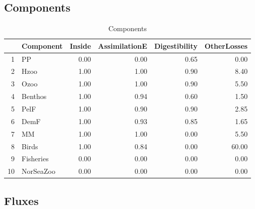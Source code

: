 \documentclass{article}
\begin{document}
\clearpage

\subsection{Components}

\begin{table}[ht]
\centering
\begin{tabular}{rlrrrr}
  \hline
 & Component & Inside & AssimilationE & Digestibility & OtherLosses \\ 
  \hline
1 & PP & 0.00 & 0.00 & 0.65 & 0.00 \\ 
  2 & Hzoo & 1.00 & 1.00 & 0.90 & 8.40 \\ 
  3 & Ozoo & 1.00 & 1.00 & 0.90 & 5.50 \\ 
  4 & Benthos & 1.00 & 0.94 & 0.60 & 1.50 \\ 
  5 & PelF & 1.00 & 0.90 & 0.90 & 2.85 \\ 
  6 & DemF & 1.00 & 0.93 & 0.85 & 1.65 \\ 
  7 & MM & 1.00 & 1.00 & 0.00 & 5.50 \\ 
  8 & Birds & 1.00 & 0.84 & 0.00 & 60.00 \\ 
  9 & Fisheries & 0.00 & 0.00 & 0.00 & 0.00 \\ 
  10 & NorSeaZoo & 0.00 & 0.00 & 0.00 & 0.00 \\ 
   \hline
\end{tabular}
\caption{Components} 
\label{Components}
\end{table}
\subsection{Fluxes}
\end{document}
